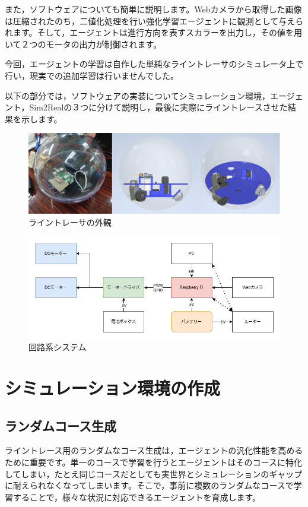 \documentclass{jsbook}
\numberwithin{equation}{section}
\begin{document}
また，ソフトウェアについても簡単に説明します。Webカメラから取得した画像は圧縮されたのち，二値化処理を行い強化学習エージェントに観測として与えられます。そして，エージェントは進行方向を表すスカラーを出力し，その値を用いて２つのモータの出力が制御されます。

今回，エージェントの学習は自作した単純なライントレーサのシミュレータ上で行い，現実での追加学習は行いませんでした。

以下の部分では，ソフトウェアの実装についてシミュレーション環境，エージェント，Sim2Realの３つに分けて説明し，最後に実際にライントレースさせた結果を示します。

\begin{figure}[h]
  \centering
  \includegraphics[width=1\hsize]{fig/image1.png}
  \caption{ライントレーサの外観}
  \label{fig:image1}
\end{figure}

\begin{figure}[h]
  \centering
  \includegraphics[width=1\hsize]{fig/image2.png}
  \caption{回路系システム}
  \label{fig:image2}
\end{figure}

\section{シミュレーション環境の作成}

\subsection{ランダムコース生成}
ライントレース用のランダムなコース生成は，エージェントの汎化性能を高めるために重要です。単一のコースで学習を行うとエージェントはそのコースに特化してしまい，たとえ同じコースだとしても実世界とシミュレーションのギャップに耐えられなくなってしまいます。そこで，事前に複数のランダムなコースで学習することで，様々な状況に対応できるエージェントを育成します。
\end{document}

